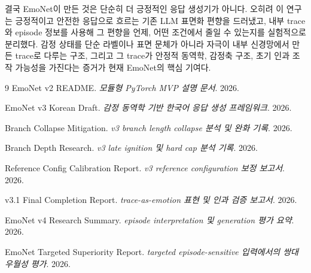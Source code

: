 \documentclass[11pt,a4paper]{article}
\begin{document}
결국 EmoNet이 만든 것은 단순히 더 긍정적인 응답 생성기가 아니다. 오히려 이 연구는 긍정적이고 안전한 응답으로 흐르는 기존 LLM 표면화 편향을 드러냈고, 내부 trace와 episode 정보를 사용해 그 편향을 언제, 어떤 조건에서 줄일 수 있는지를 실험적으로 분리했다. 감정 상태를 단순 라벨이나 표면 문체가 아니라 자극이 내부 신경망에서 만든 trace로 다루는 구조, 그리고 그 trace가 안정적 동역학, 감정축 구조, 초기 인과 조작 가능성을 가진다는 증거가 현재 EmoNet의 핵심 기여다.

\begin{thebibliography}{9}
EmoNet v2 README. \textit{모듈형 PyTorch MVP 설명 문서}. 2026.

EmoNet v3 Korean Draft. \textit{감정 동역학 기반 한국어 응답 생성 프레임워크}. 2026.

Branch Collapse Mitigation. \textit{v3 branch length collapse 분석 및 완화 기록}. 2026.

Branch Depth Research. \textit{v3 late ignition 및 hard cap 분석 기록}. 2026.

Reference Config Calibration Report. \textit{v3 reference configuration 보정 보고서}. 2026.

v3.1 Final Completion Report. \textit{trace-as-emotion 표현 및 인과 검증 보고서}. 2026.

EmoNet v4 Research Summary. \textit{episode interpretation 및 generation 평가 요약}. 2026.

EmoNet Targeted Superiority Report. \textit{targeted episode-sensitive 입력에서의 쌍대 우월성 평가}. 2026.
\end{thebibliography}
\end{document}

